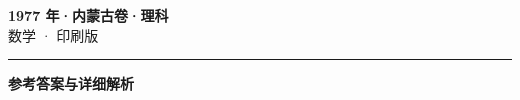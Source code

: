 \documentclass[zihao=5, a4paper]{ctexart}
\begin{document}
\begin{center}
  {\Large\bfseries 1977 年·内蒙古卷·理科}\\[4pt]
  {\large 数学 · 印刷版}
\end{center}
\medskip
{}

\par\bigskip\hrule\bigskip
{}
\begin{center}{\large\bfseries 参考答案与详细解析}\end{center}
\smallskip

\end{document}
